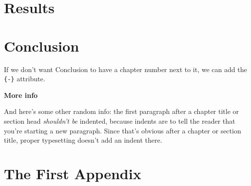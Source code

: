 \documentclass[12pt,twoside]{reedthesis}
\theoremstyle{definition}
\theoremstyle{definition}
\theoremstyle{remark}
\begin{document}
\begin{Shaded}
\begin{Highlighting}[]
  \StringTok{ }\NormalTok{ST[}\NormalTok{(ST),] }\OperatorTok{-}\StringTok{ }
  \NormalTok{    Result[Result }\OperatorTok{<=}\StringTok{ }\NormalTok{] =}\StringTok{ }
  \StringTok{ }\NormalTok{(}\NormalTok{(}\OperatorTok{-}\OperatorTok{*}\OperatorTok{*}
  
  \StringTok{ }\NormalTok{(}\NormalTok{ =}\StringTok{ }\NormalTok{ =}\StringTok{ }
                   \NormalTok{ =}\StringTok{ }\NormalTok{ =}\StringTok{ }
  \NormalTok{\}}
  \end{Highlighting}
  \end{Shaded}
  \clearpage
  \begin{Shaded}
  \begin{Highlighting}[]
  \NormalTok{(}\NormalTok{)}
  \NormalTok{(}\NormalTok{)}
  \end{Highlighting}
  \end{Shaded}
  \chapter{Results}\label{results}
  
  \chapter{Conclusion}\label{conclusion}
  
  If we don't want Conclusion to have a chapter number next to it, we can
  add the \texttt{\{-\}} attribute.
  
  \textbf{More info}
  
  And here's some other random info: the first paragraph after a chapter
  title or section head \emph{shouldn't be} indented, because indents are
  to tell the reader that you're starting a new paragraph. Since that's
  obvious after a chapter or section title, proper typesetting doesn't add
  an indent there.
  
  \appendix
  
  \chapter{The First Appendix}\label{the-first-appendix}
  
\end{document}
